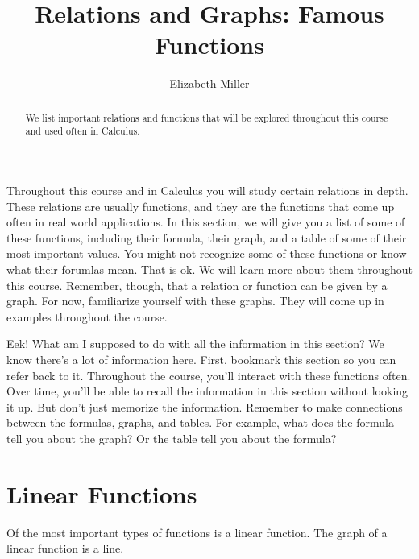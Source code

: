 \documentclass[nooutcomes]{ximera}
\author{Elizabeth Miller}
\title{Relations and Graphs: Famous Functions}
\begin{document}
\begin{abstract}
We list important relations and functions that will be explored throughout this course and used often in Calculus.
\end{abstract}
\maketitle


Throughout this course and in Calculus you will study certain relations in depth.  These relations are usually functions, and they are the functions that come up often in real world applications.  In this section, we will give you a list of some of these functions, including their formula, their graph, and a table of some of their most important values.  You might not recognize some of these functions or know what their forumlas mean.  That is ok.  We will learn more about them throughout this course.  Remember, though, that a relation or function can be given by a graph.  For now, familiarize yourself with these graphs.  They will come up in examples throughout the course.

\begin{MM}
Eek! What am I supposed to do with all the information in this section? We know there's a lot of information here. First, bookmark this section so you can refer back to it. Throughout the course, you'll interact with these functions often. Over time, you'll be able to recall the information in this section without looking it up. But don't just  memorize the information. Remember to make connections between the formulas, graphs, and tables. For example, what does the formula tell you about the graph? Or the table tell you about the formula?

\end{MM}

\newpage


\section{Linear Functions}
Of the most important types of functions is a linear function. The graph of a linear function is a line.  
\end{document}
